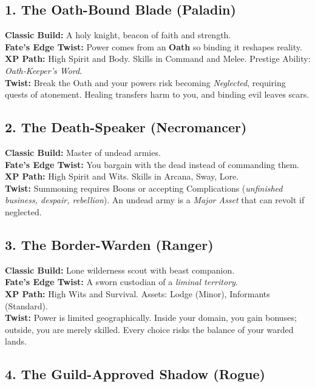 \documentclass[11pt]{book}
\begin{document}
\subsection{1. The Oath-Bound Blade (Paladin)}

\textbf{Classic Build:} A holy knight, beacon of faith and strength.\\
\textbf{Fate’s Edge Twist:} Power comes from an \textbf{Oath} so binding it
reshapes reality.\\
\textbf{XP Path:} High Spirit and Body. Skills in Command and Melee. Prestige
Ability: \emph{Oath-Keeper’s Word}.\\
\textbf{Twist:} Break the Oath and your powers risk becoming
\emph{Neglected}, requiring quests of atonement. Healing transfers harm to you,
and binding evil leaves scars.

\subsection{2. The Death-Speaker (Necromancer)}

\textbf{Classic Build:} Master of undead armies.\\
\textbf{Fate’s Edge Twist:} You bargain with the dead instead of commanding them.\\
\textbf{XP Path:} High Spirit and Wits. Skills in Arcana, Sway, Lore.\\
\textbf{Twist:} Summoning requires Boons or accepting Complications
(\emph{unfinished business, despair, rebellion}). An undead army is a
\emph{Major Asset} that can revolt if neglected.

\subsection{3. The Border-Warden (Ranger)}

\textbf{Classic Build:} Lone wilderness scout with beast companion.\\
\textbf{Fate’s Edge Twist:} A sworn custodian of a \emph{liminal territory}.\\
\textbf{XP Path:} High Wits and Survival. Assets: Lodge (Minor), Informants (Standard).\\
\textbf{Twist:} Power is limited geographically. Inside your domain, you gain
bonuses; outside, you are merely skilled. Every choice risks the balance of
your warded lands.

\subsection{4. The Guild-Approved Shadow (Rogue)}
\end{document}
